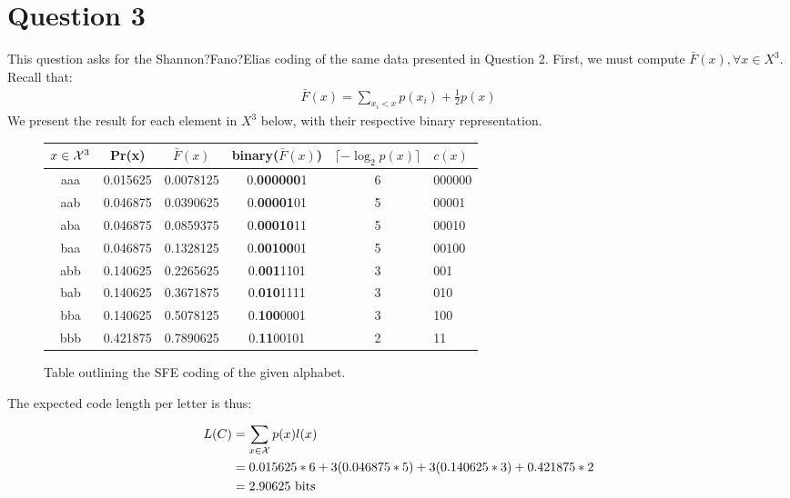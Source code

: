 \section{Question 3}
This question asks for the Shannon?Fano?Elias coding of the same data presented in Question 2.
First, we must compute $\bar{F}(x), \forall x \in X^3$.
Recall that:
\begin{align*}
\bar F(x) = \sum_{x_i < x}p(x_i) + \frac{1}{2} p(x)
\end{align*}
We present the result for each element in $X^3$ below, with their respective binary representation.
\begin{figure}[!h]
\begin{center}
\begin{tabular}{ c | c | c | c  | c | l}
 {\bf $x \in  \mathcal{X}^3$} & {\bf Pr(x)} & {\bf $\bar F(x)$} & {\bf binary($\bar F(x)$)}  & {\bf $\lceil -\log_2 p(x) \rceil$ } & {\bf $c(x)$}\\
 \hline
 aaa & 0.015625 & 0.0078125 & 0.{\bf 000000}1 & 6 & 000000\\   
 aab & 0.046875 & 0.0390625 & 0.{\bf 00001}01 & 5 & 00001\\
 aba & 0.046875 & 0.0859375 & 0.{\bf 00010}11 & 5 & 00010\\
 baa & 0.046875 & 0.1328125 & 0.{\bf 00100}01 & 5 & 00100\\
 abb & 0.140625 & 0.2265625 & 0.{\bf 001}1101 & 3 & 001\\
 bab & 0.140625 & 0.3671875 & 0.{\bf 010}1111 & 3 & 010\\
 bba & 0.140625 & 0.5078125 & 0.{\bf 100}0001 & 3 & 100\\
 bbb & 0.421875 & 0.7890625 &  0.{\bf 11}00101 & 2 & 11\\
\end{tabular}
\end{center}
\caption{Table outlining the SFE coding of the given alphabet.}
\end{figure}

The expected code length per letter is thus:

\begin{align*}
L(C) & = \sum_{x \in  \mathcal{X}} p(x)l(x)\\
& =  0.015625*6 + 3(0.046875*5) + 3(0.140625*3) + 0.421875*2\\
& = 2.90625~\text{bits}
\end{align*}